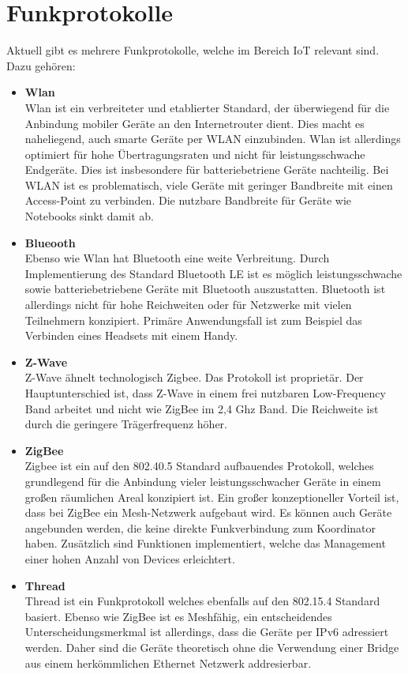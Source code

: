 \section{Funkprotokolle}
Aktuell gibt es mehrere Funkprotokolle, welche im Bereich IoT relevant sind. Dazu gehören:
\begin{itemize}
    \item \textbf{Wlan} \\
    Wlan ist ein verbreiteter und etablierter Standard, der überwiegend für die Anbindung mobiler Geräte an den
    Internetrouter dient. Dies macht es naheliegend, auch smarte Geräte per WLAN einzubinden. Wlan ist allerdings 
    optimiert für hohe Übertragungsraten und nicht für leistungsschwache Endgeräte. Dies ist
    insbesondere für batteriebetriene Geräte nachteilig. Bei WLAN ist es problematisch, viele Geräte mit geringer Bandbreite mit einen Access-Point zu verbinden.
    Die nutzbare Bandbreite für Geräte wie Notebooks sinkt damit ab. 

    \item \textbf{Blueooth}\\
    Ebenso wie Wlan hat Bluetooth eine weite Verbreitung. Durch Implementierung 
    des Standard Bluetooth LE ist es möglich leistungsschwache sowie batteriebetriebene Geräte mit Bluetooth auszustatten. Bluetooth
    ist allerdings nicht für hohe Reichweiten oder für Netzwerke mit vielen Teilnehmern konzipiert. Primäre Anwendungsfall ist zum Beispiel das Verbinden eines Headsets mit 
    einem Handy. 

    \item \textbf{Z-Wave}\\
    
    Z-Wave ähnelt technologisch Zigbee. Das Protokoll ist proprietär. Der Hauptunterschied ist, dass Z-Wave in einem frei nutzbaren
    Low-Frequency Band arbeitet und nicht wie ZigBee im 2,4 Ghz Band. Die Reichweite ist durch die geringere Trägerfrequenz höher.

    \item \textbf{ZigBee}\\
    Zigbee \cite{zigbee} ist ein auf den 802.40.5 Standard aufbauendes Protokoll, welches grundlegend für die Anbindung vieler leistungsschwacher
    Geräte in einem großen räumlichen Areal konzipiert ist. Ein großer konzeptioneller Vorteil ist, dass bei 
    ZigBee ein Mesh-Netzwerk aufgebaut wird. Es können auch Geräte angebunden werden, die keine direkte Funkverbindung
    zum Koordinator haben. Zusätzlich sind Funktionen implementiert, welche das Management einer hohen Anzahl von Devices
    erleichtert.
    
    \item \textbf{Thread}\\
    Thread ist ein Funkprotokoll welches ebenfalls auf den 802.15.4 Standard basiert. Ebenso wie ZigBee ist es Meshfähig, ein
    entscheidendes Unterscheidungsmerkmal ist allerdings, dass die Geräte per IPv6 adressiert werden. Daher sind die Geräte
    theoretisch ohne die Verwendung einer Bridge aus einem herkömmlichen Ethernet Netzwerk addresierbar.
\end{itemize}

